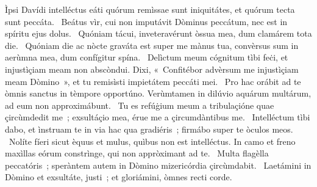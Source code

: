 { Ìpsi Davídi intelléctus}
{%
eáti quórum remìssae sunt iniquitátes, et quórum tecta sunt peccáta. 
~Beátus vìr, cui non imputávit Dòminus peccátum, nec est in spíritu ejus dolus. 
~Quóniam tácui, inveteravérunt òssua mea, dum clamárem tota die. 
~Quóniam die ac nòcte graváta est super me mànus tua, convèrsus sum in aerùmna mea, dum confígitur spína. 
~Delìctum meum cógnitum tìbi feċi, et injustìçiam meam non abscòndui. Dixi, «~Confitébor advèrsum me injustìçiam meam Dòmino~», et tu remisìsti impietátem peccáti mei. 
~Pro hac orábit ad te òmnis sanctus in tèmpore opportúno. Verùmtamen in dilúvio aquárum multárum, ad eum non approximábunt. 
~Tu es refúġium meum a tribulaçióne quae çircùmdedit me~; exsultáçio mea, érue me a çircumdàntibus me. 
~Intelléctum tìbi dabo, et ìnstruam te in via hac qua gradiéris~; firmábo super te òculos meos. 
~Nolíte fíeri sicut èquus et mulus, quìbus non est intelléctus. In camo et freno maxìllas eórum constrìnge, qui non appròximant ad te. 
~Multa flagèlla peccatóris~; speràntem autem in Dòmino mizericórdia çircùmdabit. 
~Laetámini in Dòmino et exsultáte, justi~; et gloriámini, òmnes recti corde. 
}
